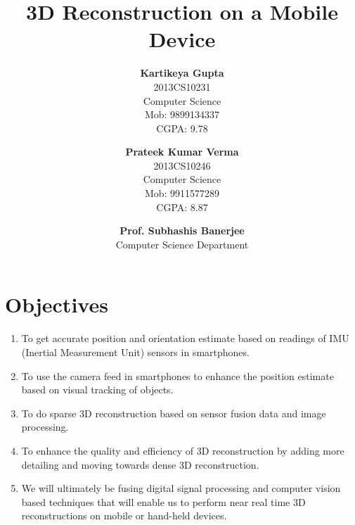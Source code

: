 \documentclass{article}
\title{\vspace*{\fill} \textbf{3D Reconstruction on a Mobile Device}}
\author{
	\textbf{Kartikeya Gupta}\\ 
	2013CS10231\\
	Computer Science\\
	Mob: 9899134337\\
	CGPA: 9.78
	\and
	\textbf{Prateek Kumar Verma}\\ 
	2013CS10246\\
	Computer Science\\
	Mob: 9911577289\\
	CGPA: 8.87
}
\date{\textbf{Prof. Subhashis Banerjee} \\ Computer Science Department \vspace*{\fill}}
\begin{document}
	\maketitle

	\newpage
	\section{Objectives}
		\begin{enumerate}
			\item 
				To get accurate position and orientation estimate based on readings of IMU (Inertial Measurement Unit) sensors in smartphones. 
			\item
				To use the camera feed in smartphones to enhance the position estimate based on visual tracking of objects.
			\item 
				To do sparse 3D reconstruction based on sensor fusion data and image processing.
			\item
				To enhance the quality and efficiency of 3D reconstruction by adding more detailing and moving towards dense 3D reconstruction.
			\item
				We will ultimately be fusing digital signal processing and computer vision based techniques that will enable us to perform near real time 3D reconstructions on mobile or hand-held devices.
		\end{enumerate}
\end{document}
